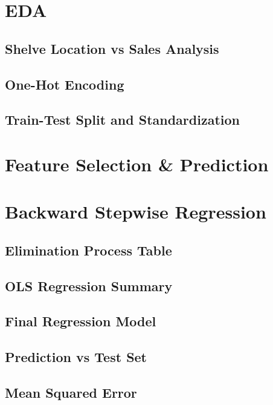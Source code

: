 \documentclass[12pt]{article}
\begin{document}
\maketitlepage

\section{EDA}

\subsection{Shelve Location vs Sales Analysis}

\subsection{One-Hot Encoding}

\subsection{Train-Test Split and Standardization}

\section*{Feature Selection \& Prediction}

\section{Backward Stepwise Regression}

\subsection{Elimination Process Table}

\subsection{OLS Regression Summary}

\subsection{Final Regression Model}

\subsection{Prediction vs Test Set}

\subsection{Mean Squared Error}
\end{document}

